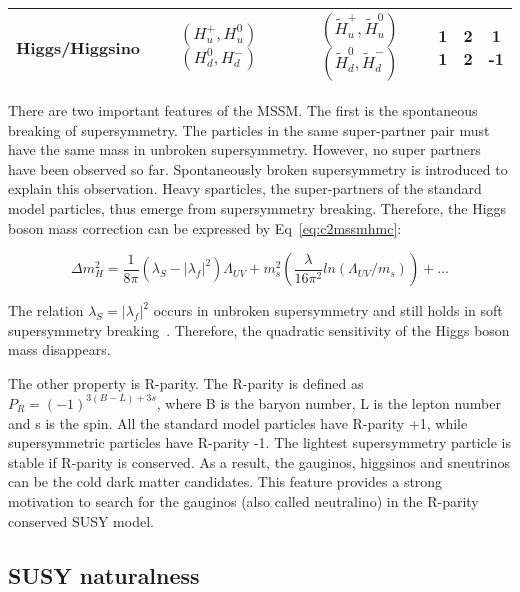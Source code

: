 \begin{table}[htbp]
\begin{centering}
\begin{tabular}{|c|c|c|c|c|c|}
\hline
Higgs/Higgsino   & \specialcell{$(H_{u}^{+},H_{u}^{0})$ \\ $(H_{d}^{0},H_{d}^{-})$} & \specialcell{$(\tilde{H}_{u}^{+},\tilde{H}_{u}^{0})$ \\ $(\tilde{H}_{d}^{0},\tilde{H}_{d}^{-})$} & \specialcell{1 \\ 1} & \specialcell{2 \\ 2} & \specialcell{1 \\ -1} \\
\hline
\end{tabular}
\par\end{centering}
\end{table}

There are two important features of the MSSM. The first is the spontaneous breaking of supersymmetry. The particles in the same super-partner pair must have the same mass in unbroken supersymmetry. However, no super partners have been observed so far. Spontaneously broken supersymmetry is introduced to explain this observation. Heavy sparticles, the super-partners of the standard model particles, thus emerge from supersymmetry breaking. Therefore, the Higgs boson mass correction can be expressed by Eq~\ref{eq:c2mssmhmc}:

\begin{equation}
 \Delta m_{H}^{2} = \frac{1}{8\pi}(\lambda_{S}-|\lambda_{f}|^{2})\Lambda_{UV}+m_{s}^{2}(\frac{\lambda}{16\pi^{2}}ln(\Lambda_{UV}/m_{s}))+...
 \label{eq:c2mssmhmc}
\end{equation}

The relation $\lambda_{S}=|\lambda_{f}|^{2}$ occurs in unbroken supersymmetry and still holds in soft supersymmetry breaking~\cite{Martin:1997ns}. Therefore, the quadratic sensitivity of the Higgs boson mass disappears.

The other property is R-parity. The R-parity is defined as $P_{R}=(-1)^{3(B-L)+3s}$, where B is the baryon number, L is the lepton number and s is the spin. All the standard model particles have R-parity +1, while supersymmetric particles have R-parity -1. The lightest supersymmetry particle is stable if R-parity is conserved. As a result, the gauginos, higgsinos and sneutrinos can be the cold dark matter candidates. This feature provides a strong motivation to search for the gauginos (also called neutralino) in the R-parity conserved SUSY model. 

\subsection{SUSY naturalness}

